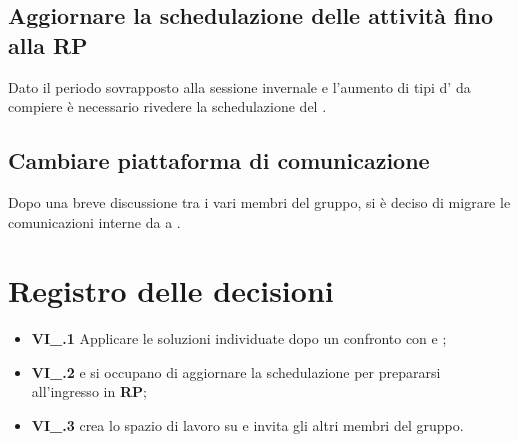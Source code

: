 \subsection{Aggiornare la schedulazione delle attività fino alla RP}
Dato il periodo sovrapposto alla sessione invernale e l'aumento di tipi d' da compiere è necessario rivedere la schedulazione del \PdP.
\subsection{Cambiare piattaforma di comunicazione}
Dopo una breve discussione tra i vari membri del gruppo, si è deciso di migrare le comunicazioni interne da  a .

\section{Registro delle decisioni}
\begin{itemize}
  \item \textbf{VI\_\Data.1} Applicare le soluzioni individuate dopo un confronto con \VT e \CR;
  \item \textbf{VI\_\Data.2} \MM e \TL si occupano di aggiornare la schedulazione per prepararsi all'ingresso in \textbf{RP};
  \item \textbf{VI\_\Data.3} \FF crea lo spazio di lavoro su  e invita gli altri membri del gruppo.
\end{itemize}